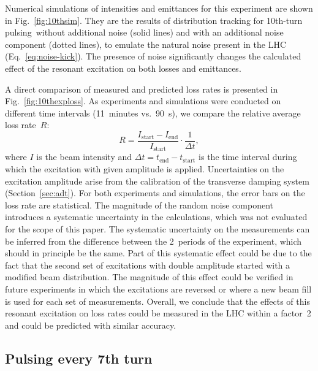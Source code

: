 \documentclass[aps
,prstab
,reprint
,longbibliography
,preprintnumbers
,showkeys
,amsfonts,amssymb,amsmath
,floatfix
]{revtex4-1}
\newcommand{\tenthtp}{10th-turn pulsing}
\begin{document}
Numerical simulations of intensities and emittances for this
experiment are shown in Fig.~\ref{fig:10thsim}. They are the results
of distribution tracking for \tenthtp\ without
additional noise (solid lines) and with an additional noise component
(dotted lines), to emulate the natural noise present in the LHC
(Eq.~\ref{eq:noise-kick}). The presence of noise significantly changes
the calculated effect of the resonant excitation on both losses and
emittances.

A direct comparison of measured and predicted loss rates is presented
in Fig.~\ref{fig:10thexploss}. As experiments and simulations were
conducted on different time intervals (11~minutes vs.\ 90~s), we
compare the relative average loss rate~$R$:
%
\begin{equation}
  \label{eqn:lossrate}
  R = \frac{I_{\mathrm{start}} - I_{\mathrm{end}}}{I_{\mathrm{start}}}
  \cdot \frac{1}{\Delta t},
\end{equation}
%
where $I$ is the beam intensity and
$\Delta t = t_\mathrm{end} - t_\mathrm{start}$ is the time interval
during which the excitation with given amplitude is
applied. Uncertainties on the excitation amplitude arise from the
calibration of the transverse damping system
(Section~\ref{sec:adt}). For both experiments and simulations, the
error bars on the loss rate are statistical. The magnitude of the
random noise component introduces a systematic uncertainty in the
calculations, which was not evaluated for the scope of this paper. The
systematic uncertainty on the measurements can be inferred from the
difference between the 2~periods of the experiment, which should in
principle be the same. Part of this systematic effect could be due to
the fact that the second set of excitations with double amplitude
started with a modified beam distribution. The magnitude of this
effect could be verified in future experiments in which the
excitations are reversed or where a new beam fill is used for each set
of measurements. Overall, we conclude that the effects of this
resonant excitation on loss rates could be measured in the LHC within
a factor~2 and could be predicted with similar accuracy.



\subsection{Pulsing every 7th turn}
\label{sec:simex7}
\end{document}

